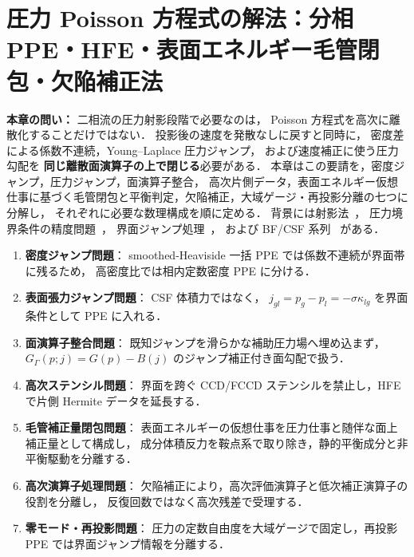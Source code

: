 %
%
\section{圧力 Poisson 方程式の解法：分相 PPE・HFE・表面エネルギー毛管閉包・欠陥補正法}
\label{sec:ppe_solve}

\noindent\textbf{本章の問い：}
二相流の圧力射影段階で必要なのは，
Poisson 方程式を高次に離散化することだけではない．
投影後の速度を発散なしに戻すと同時に，
密度差による係数不連続，Young--Laplace 圧力ジャンプ，
および速度補正に使う圧力勾配を
\textbf{同じ離散面演算子の上で閉じる}必要がある．
本章はこの要請を，密度ジャンプ，圧力ジャンプ，面演算子整合，
高次片側データ，表面エネルギー仮想仕事に基づく毛管閉包と平衡判定，欠陥補正，大域ゲージ・再投影分離の七つに分解し，
それぞれに必要な数理構成を順に定める．
背景には射影法~\cite{Chorin1968,vanKan1986,Guermond2006}，
圧力境界条件の精度問題~\cite{BrownCortezMinion2001,PyoShen2007}，
界面ジャンプ処理~\cite{Fedkiw1999,Kang2000,LeVequeLi1994}，
および BF/CSF 系列~\cite{Brackbill1992,Francois2006,Popinet2009} がある．

\begin{tcolorbox}[mybox,title={§9 の構成原理}]
\begin{enumerate}[noitemsep]
  \item \textbf{密度ジャンプ問題}：
        smoothed-Heaviside 一括 PPE では係数不連続が界面帯に残るため，
        高密度比では相内定数密度 PPE に分ける．
  \item \textbf{表面張力ジャンプ問題}：
        CSF 体積力ではなく，
        $j_{gl}=p_g-p_l=-\sigma\kappa_{lg}$ を界面条件として PPE に入れる．
  \item \textbf{面演算子整合問題}：
        既知ジャンプを滑らかな補助圧力場へ埋め込まず，
        $G_\Gamma(p;j)=G(p)-B(j)$ のジャンプ補正付き面勾配で扱う．
  \item \textbf{高次ステンシル問題}：
        界面を跨ぐ CCD/FCCD ステンシルを禁止し，HFE で片側 Hermite データを延長する．
  \item \textbf{毛管補正量閉包問題}：
        表面エネルギーの仮想仕事を圧力仕事と随伴な面上補正量として構成し，
        成分体積反力を鞍点系で取り除き，静的平衡成分と非平衡駆動を分離する．
  \item \textbf{高次演算子処理問題}：
        欠陥補正により，高次評価演算子と低次補正演算子の役割を分離し，
        反復回数ではなく高次残差で受理する．
  \item \textbf{零モード・再投影問題}：
        圧力の定数自由度を大域ゲージで固定し，再投影 PPE では界面ジャンプ情報を分離する．
\end{enumerate}
\end{tcolorbox}

